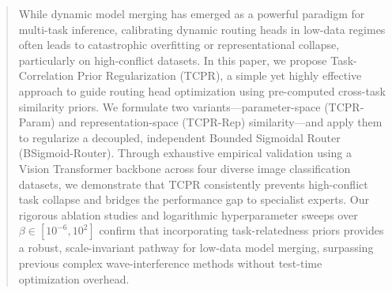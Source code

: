 \begin{abstract}
While dynamic model merging has emerged as a powerful paradigm for multi-task inference, calibrating dynamic routing heads in low-data regimes often leads to catastrophic overfitting or representational collapse, particularly on high-conflict datasets. In this paper, we propose Task-Correlation Prior Regularization (TCPR), a simple yet highly effective approach to guide routing head optimization using pre-computed cross-task similarity priors. We formulate two variants---parameter-space (TCPR-Param) and representation-space (TCPR-Rep) similarity---and apply them to regularize a decoupled, independent Bounded Sigmoidal Router (BSigmoid-Router). Through exhaustive empirical validation using a Vision Transformer backbone across four diverse image classification datasets, we demonstrate that TCPR consistently prevents high-conflict task collapse and bridges the performance gap to specialist experts. Our rigorous ablation studies and logarithmic hyperparameter sweeps over $\beta \in [10^{-6}, 10^2]$ confirm that incorporating task-relatedness priors provides a robust, scale-invariant pathway for low-data model merging, surpassing previous complex wave-interference methods without test-time optimization overhead.
\end{abstract}
